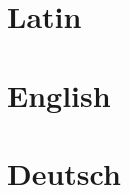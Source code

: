 \documentclass[oneside,12pt,headlines=1.5]{scrreprt}
\begin{document}
\maketitle

\section*{Latin}
\selectlanguage{\latin}
\blindtext 

\section*{English}
\selectlanguage{\english}
\blindtext 

\section*{Deutsch}
\selectlanguage{\ngerman}
\blindtext 
\end{document}
